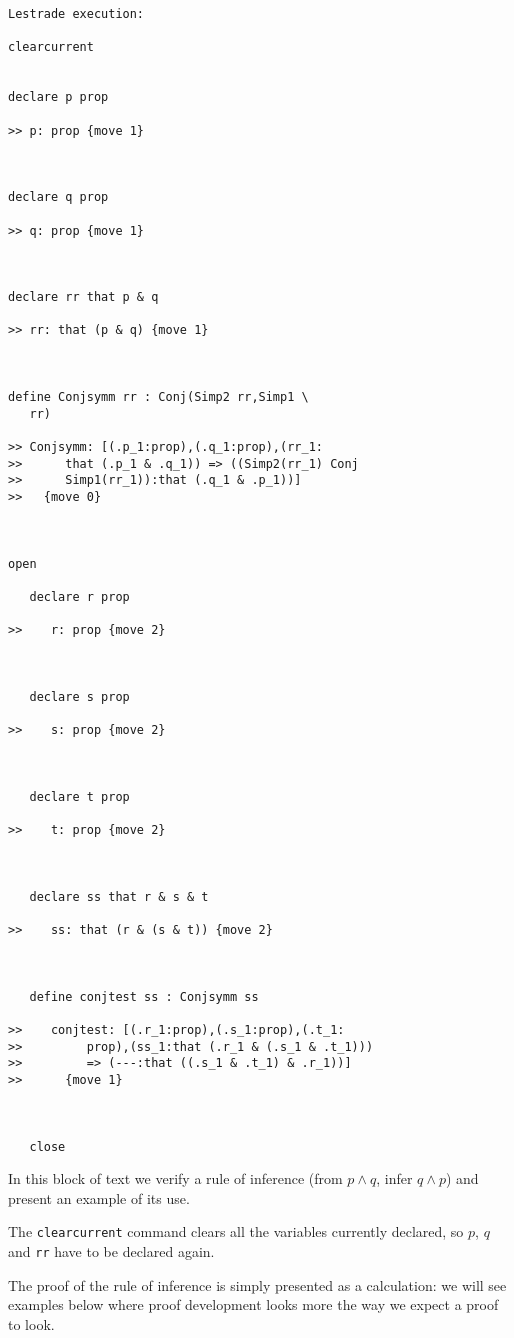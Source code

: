 \documentclass[12pt]{article}
\begin{document}
\begin{verbatim}Lestrade execution:

clearcurrent


declare p prop

>> p: prop {move 1}



declare q prop

>> q: prop {move 1}



declare rr that p & q

>> rr: that (p & q) {move 1}



define Conjsymm rr : Conj(Simp2 rr,Simp1 \
   rr)

>> Conjsymm: [(.p_1:prop),(.q_1:prop),(rr_1:
>>      that (.p_1 & .q_1)) => ((Simp2(rr_1) Conj
>>      Simp1(rr_1)):that (.q_1 & .p_1))]
>>   {move 0}



open

   declare r prop

>>    r: prop {move 2}



   declare s prop

>>    s: prop {move 2}



   declare t prop

>>    t: prop {move 2}



   declare ss that r & s & t

>>    ss: that (r & (s & t)) {move 2}



   define conjtest ss : Conjsymm ss

>>    conjtest: [(.r_1:prop),(.s_1:prop),(.t_1:
>>         prop),(ss_1:that (.r_1 & (.s_1 & .t_1)))
>>         => (---:that ((.s_1 & .t_1) & .r_1))]
>>      {move 1}



   close
\end{verbatim}

In this block of text we verify a rule of inference (from $p \wedge q$, infer $q \wedge p$) and present an example of its use.

The {\tt clearcurrent} command clears all the variables currently declared, so $p$, $q$ and {\tt rr} have to be declared again.

The proof of the rule of inference is simply presented as a calculation:  we will see examples below where proof development looks more the way we expect a proof to look.
\end{document}
